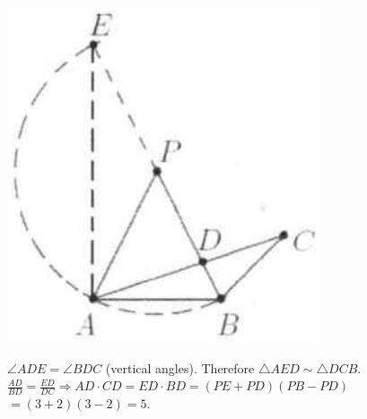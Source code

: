 \documentclass[10pt]{article}
\begin{document}
\includegraphics[max width=\textwidth, center]{2025_04_17_97bc1f7e44d93c271a88g-211}


\(\angle A D E=\angle B D C\) (vertical angles). Therefore \(\triangle A E D \sim \triangle D C B\).\\
\(\frac{A D}{B D}=\frac{E D}{D C} \Rightarrow A D \cdot C D=E D \cdot B D=(P E+P D)(P B-P D)\)\\
\(=(3+2)(3-2)=5\).
\end{document}
